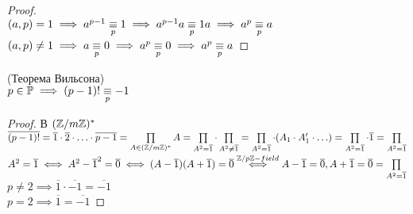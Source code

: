 \begin{normalsize}
\begin{proof}\\
    $(a, p) = 1 \implies a^{p-1} \underset{p}{\equiv} 1 \implies a^{p-1}a \underset{p}{\equiv} 1a \implies a^p \underset{p}{\equiv} a$\\
    $(a, p) \neq 1 \implies a \underset{p}{\equiv} 0 \implies a^p \underset{p}{\equiv} 0 \implies a^p \underset{p}{\equiv} a$
\end{proof}

\begin{theorem}(Теорема Вильсона)\\
    $p \in \mathbb{P} \implies (p-1)! \underset{p}{\equiv} -1$
\end{theorem}

\begin{proof}
    В $(\mathbb{Z}/m\mathbb{Z})^*$ \\
    $\overline{(p-1)!} = \overline{1} \cdot \overline{2} \cdot \ldots \cdot \overline{p-1} = \prod\limits_{A \in (\mathbb{Z}/m\mathbb{Z})^*} A = 
    \prod\limits_{A^2 = \overline{1}} \cdot \prod\limits_{A^2 \neq \overline{1}} = \prod\limits_{A^2 = \overline{1}} \cdot (A_1 \cdot A_1' \cdot \ldots) = \prod\limits_{A^2 = \overline{1}} \cdot \overline{1} = \prod\limits_{A^2 = \overline{1}}$\\
    $A^2 = \overline{1} \iff A^2 - \overline{1}^2 = \overline{0} \iff (A - \overline{1})(A + \overline{1}) = \overline{0} \overset{\mathbb{Z}/p\mathbb{Z} - field}{\iff} A - \overline{1} = \overline{0}, A + \overline{1} = \overline{0} = \prod\limits_{A^2 = \overline{1}}$
    $p \neq 2 \implies \overline{1} \cdot \overline{-1} = \overline{-1}$\\
    $p = 2 \implies \overline{1} = \overline{-1}$
\end{proof}

\end{normalsize}


